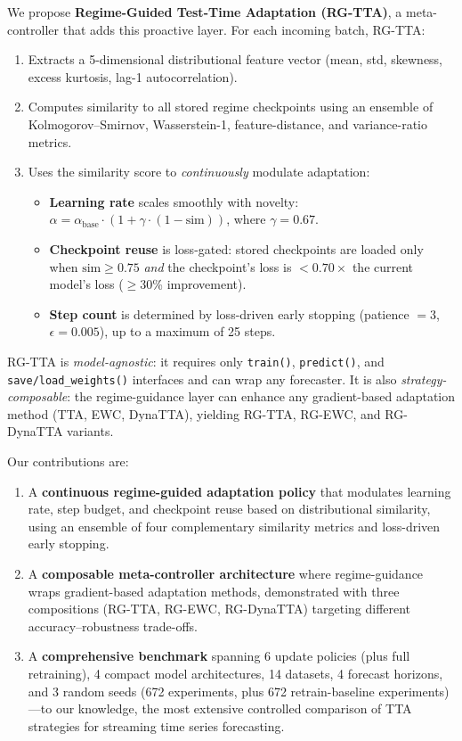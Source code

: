 \documentclass[journal]{IEEEtran}
\begin{document}
We propose \textbf{Regime-Guided Test-Time Adaptation (RG-TTA)}, a meta-controller that adds this proactive layer. For each incoming batch, RG-TTA:
\begin{enumerate}[nosep]
  \item Extracts a 5-dimensional distributional feature vector (mean, std, skewness, excess kurtosis, lag-1 autocorrelation).
  \item Computes similarity to all stored regime checkpoints using an ensemble of Kolmogorov--Smirnov, Wasserstein-1, feature-distance, and variance-ratio metrics.
  \item Uses the similarity score to \emph{continuously} modulate adaptation:
  \begin{itemize}[nosep]
    \item \textbf{Learning rate} scales smoothly with novelty: $\alpha = \alpha_{\text{base}} \cdot (1 + \gamma \cdot (1 - \text{sim}))$, where $\gamma = 0.67$.
    \item \textbf{Checkpoint reuse} is loss-gated: stored checkpoints are loaded only when $\text{sim} \geq 0.75$ \emph{and} the checkpoint's loss is $< 0.70 \times$ the current model's loss ($\geq$30\% improvement).
    \item \textbf{Step count} is determined by loss-driven early stopping (patience $= 3$, $\epsilon = 0.005$), up to a maximum of 25 steps.
  \end{itemize}
\end{enumerate}

RG-TTA is \emph{model-agnostic}: it requires only \texttt{train()}, \texttt{predict()}, and \texttt{save/load\_weights()} interfaces and can wrap any forecaster. It is also \emph{strategy-composable}: the regime-guidance layer can enhance any gradient-based adaptation method (TTA, EWC, DynaTTA), yielding RG-TTA, RG-EWC, and RG-DynaTTA variants.

Our contributions are:
\begin{enumerate}[nosep]
  \item A \textbf{continuous regime-guided adaptation policy} that modulates learning rate, step budget, and checkpoint reuse based on distributional similarity, using an ensemble of four complementary similarity metrics and loss-driven early stopping.
  \item A \textbf{composable meta-controller architecture} where regime-guidance wraps gradient-based adaptation methods, demonstrated with three compositions (RG-TTA, RG-EWC, RG-DynaTTA) targeting different accuracy--robustness trade-offs.
  \item A \textbf{comprehensive benchmark} spanning 6 update policies (plus full retraining), 4 compact model architectures, 14 datasets, 4 forecast horizons, and 3 random seeds (672 experiments, plus 672 retrain-baseline experiments)---to our knowledge, the most extensive controlled comparison of TTA strategies for streaming time series forecasting.
\end{enumerate}
\end{document}
